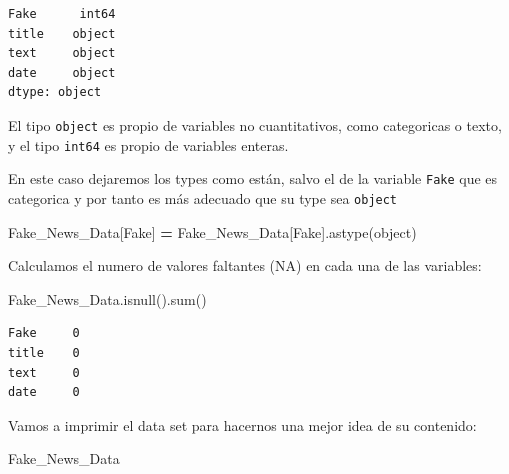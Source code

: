 \documentclass[
  11pt,
  a4paper,
]{article}
\newenvironment{Shaded}{\begin{snugshade}}{\end{snugshade}}
\newcommand{\BuiltInTok}[1]{#1}
\newcommand{\NormalTok}[1]{#1}
\newcommand{\OperatorTok}[1]{\textcolor[rgb]{0.81,0.36,0.00}{\textbf{#1}}}
\newcommand{\StringTok}[1]{\textcolor[rgb]{0.31,0.60,0.02}{#1}}
\begin{document}
\begin{verbatim}
Fake      int64
title    object
text     object
date     object
dtype: object
\end{verbatim}

El tipo \texttt{object} es propio de variables no cuantitativos, como
categoricas o texto, y el tipo \texttt{int64} es propio de variables
enteras.

En este caso dejaremos los types como están, salvo el de la variable
\texttt{Fake} que es categorica y por tanto es más adecuado que su type
sea \texttt{object}

\begin{Shaded}
\begin{Highlighting}[]
\NormalTok{Fake\_News\_Data[}\StringTok{\textquotesingle{}Fake\textquotesingle{}}\NormalTok{] }\OperatorTok{=}\NormalTok{ Fake\_News\_Data[}\StringTok{\textquotesingle{}Fake\textquotesingle{}}\NormalTok{].astype(}\StringTok{\textquotesingle{}object\textquotesingle{}}\NormalTok{)}
\end{Highlighting}
\end{Shaded}

Calculamos el numero de valores faltantes (NA) en cada una de las
variables:

\begin{Shaded}
\begin{Highlighting}[]
\NormalTok{Fake\_News\_Data.isnull().}\BuiltInTok{sum}\NormalTok{()}
\end{Highlighting}
\end{Shaded}

\begin{verbatim}
Fake     0
title    0
text     0
date     0
\end{verbatim}

Vamos a imprimir el data set para hacernos una mejor idea de su
contenido:

\begin{Shaded}
\begin{Highlighting}[]
\NormalTok{Fake\_News\_Data }
\end{Highlighting}
\end{Shaded}
\end{document}

